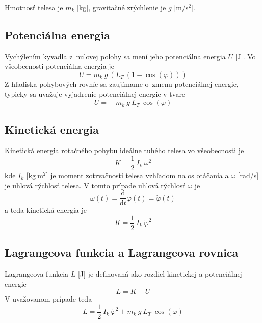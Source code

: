 \documentclass[a4paper, 10pt, ]{article}
\begin{document}
Hmotnosť telesa je $m_k$ [kg], gravitačné zrýchlenie je $g$ [m/s$^2$]. 



\subsection{Potenciálna energia}

Vychýlením kyvadla z~nulovej polohy sa mení jeho potenciálna energia $U$ [J]. Vo všeobecnosti potenciálna energia je 
\begin{equation}
    U =  m_k \  g \  \left( L_T \ (1 -\cos(\varphi)) \right) 
\end{equation}
Z hľadiska pohybových rovníc sa zaujímame o~zmenu potenciálnej energie, typicky sa uvažuje vyjadrenie potenciálnej energie v tvare
\begin{equation}
    U = - \  m_k \  g \   L_T \  \cos(\varphi) 
\end{equation}




\subsection{Kinetická energia}

Kinetická energia rotačného pohybu ideálne tuhého telesa vo všeobecnosti je 
\begin{equation}
    K = \frac{1}{2} \  I_k \  \omega^2
\end{equation}
kde $I_k$ [kg$\ $m$^2$] je moment zotrvačnosti telesa vzhľadom na os otáčania a $\omega$ [rad/s] je uhlová rýchlosť telesa. V tomto prípade uhlová rýchlosť $\omega$ je 
\begin{equation}
    \omega(t) = \frac{\text{d}}{\text{d}t} \varphi(t) =   \dot\varphi(t)
\end{equation}
a teda kinetická energia je
\begin{equation}
    K = \frac{1}{2} \  I_k \  \dot\varphi^2
\end{equation}


\subsection{Lagrangeova funkcia a Lagrangeova rovnica}

Lagrangeova funkcia $L$ [J] je definovaná ako rozdiel kinetickej a potenciálnej energie
\begin{equation}
    L = K - U
\end{equation}
V uvažovanom prípade teda
\begin{equation}
    L = \frac{1}{2} \  I_k \  \dot\varphi^2 + m_k \  g \   L_T \  \cos(\varphi)
\end{equation}
\end{document}
